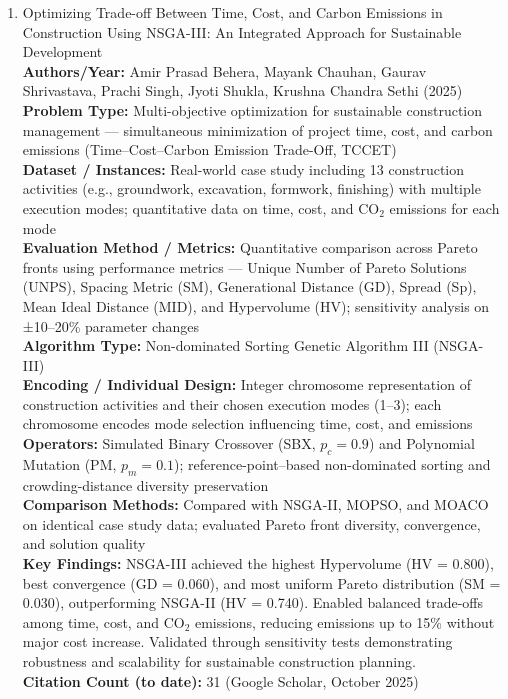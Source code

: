 \documentclass[a4paper,12pt]{article}
\begin{document}
\begin{enumerate}[leftmargin=2em, labelwidth=1em, labelsep=0.5em, itemsep=1ex]
  \item Optimizing Trade-off Between Time, Cost, and Carbon Emissions in Construction Using NSGA-III: An Integrated Approach for Sustainable Development \\
    \textbf{Authors/Year:} Amir Prasad Behera, Mayank Chauhan, Gaurav Shrivastava, Prachi Singh, Jyoti Shukla, Krushna Chandra Sethi (2025) \\  
    \textbf{Problem Type:} Multi-objective optimization for sustainable construction management — simultaneous minimization of project time, cost, and carbon emissions (Time–Cost–Carbon Emission Trade-Off, TCCET) \\  
    \textbf{Dataset / Instances:} Real-world case study including 13 construction activities (e.g., groundwork, excavation, formwork, finishing) with multiple execution modes; quantitative data on time, cost, and CO$_2$ emissions for each mode \\  
    \textbf{Evaluation Method / Metrics:} Quantitative comparison across Pareto fronts using performance metrics — Unique Number of Pareto Solutions (UNPS), Spacing Metric (SM), Generational Distance (GD), Spread (Sp), Mean Ideal Distance (MID), and Hypervolume (HV); sensitivity analysis on ±10–20\% parameter changes \\  
    \textbf{Algorithm Type:} Non-dominated Sorting Genetic Algorithm III (NSGA-III) \\  
    \textbf{Encoding / Individual Design:} Integer chromosome representation of construction activities and their chosen execution modes (1–3); each chromosome encodes mode selection influencing time, cost, and emissions \\  
    \textbf{Operators:} Simulated Binary Crossover (SBX, $p_c=0.9$) and Polynomial Mutation (PM, $p_m=0.1$); reference-point–based non-dominated sorting and crowding-distance diversity preservation \\  
    \textbf{Comparison Methods:} Compared with NSGA-II, MOPSO, and MOACO on identical case study data; evaluated Pareto front diversity, convergence, and solution quality \\  
    \textbf{Key Findings:} NSGA-III achieved the highest Hypervolume (HV = 0.800), best convergence (GD = 0.060), and most uniform Pareto distribution (SM = 0.030), outperforming NSGA-II (HV = 0.740). Enabled balanced trade-offs among time, cost, and CO$_2$ emissions, reducing emissions up to 15\% without major cost increase. Validated through sensitivity tests demonstrating robustness and scalability for sustainable construction planning. \\  
    \textbf{Citation Count (to date):} 31 (Google Scholar, October 2025) \\[2ex]

\end{enumerate}
 
\end{document}
